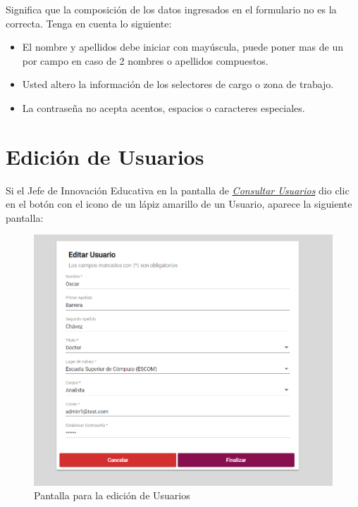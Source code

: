 \begin{itemize}
\begin{figure}[!hbtp]
                        \end{figure}
                    
                        Significa que la composición de los datos ingresados en el formulario no es la correcta. Tenga en cuenta lo siguiente:
                    
                        \begin{itemize}
                            \item El nombre y apellidos debe iniciar con mayúscula, puede poner mas de un por campo en caso de 2 nombres o apellidos compuestos.
                            \item Usted altero la información de los selectores de cargo o zona de trabajo.
                            \item La contraseña no acepta acentos, espacios o caracteres especiales.
                        \end{itemize}
                    
                \end{itemize}

\newpage

            \section{Edición de Usuarios} 
                Si el Jefe de Innovación Educativa en la pantalla de \hyperlink{consultarUs}{\textit{Consultar Usuarios}} dio clic en el botón con el icono de un lápiz amarillo de un Usuario, aparece la siguiente pantalla:
                
                \begin{figure}[!hbtp]
                    \centering
                    \hypertarget{editarUs}{\includegraphics[width=0.6\linewidth]{images/SP5/Editar-Usuario}}
                    \caption{Pantalla para la edición de Usuarios}
                    \label{editarrh}
                \end{figure}
                
